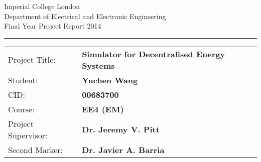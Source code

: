 \documentclass[11pt,a4paper,twoside]{memoir} %
\begin{document}
%
\begin{titlingpage}
                \setlength{\parindent}{0pt}
                \setlength{\parskip}{0pt}

                {
                                \Large
                                \raggedright
                                Imperial College London\\[17pt]
                                Department of Electrical and Electronic Engineering\\[17pt]
                                Final Year Project Report 2014\\[17pt]
 
                }

                \rule{\columnwidth}{3pt}
                \vfill
                \centering
                \vfill
                \setlength{\tabcolsep}{0pt}

                \begin{tabular}{p{40mm}p{\dimexpr\columnwidth-40mm}}
                                Project Title: & \textbf{Simulator for Decentralised Energy Systems} \\[12pt]
                                Student: & \textbf{Yuchen Wang} \\[12pt]
                                CID: & \textbf{00683700} \\[12pt]
                                Course: & \textbf{EE4 (EM)} \\[12pt]
                                Project Supervisor: & \textbf{Dr. Jeremy V. Pitt} \\[12pt]
                                Second Marker: & \textbf{Dr. Javier A. Barria} \\
                \end{tabular}
\end{titlingpage}


\frontmatter %

\end{document}
